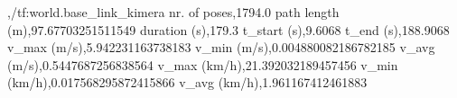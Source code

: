 ,/tf:world.base_link_kimera
nr. of poses,1794.0
path length (m),97.67703251511549
duration (s),179.3
t_start (s),9.6068
t_end (s),188.9068
v_max (m/s),5.942231163738183
v_min (m/s),0.004880082186782185
v_avg (m/s),0.5447687256838564
v_max (km/h),21.392032189457456
v_min (km/h),0.017568295872415866
v_avg (km/h),1.961167412461883
